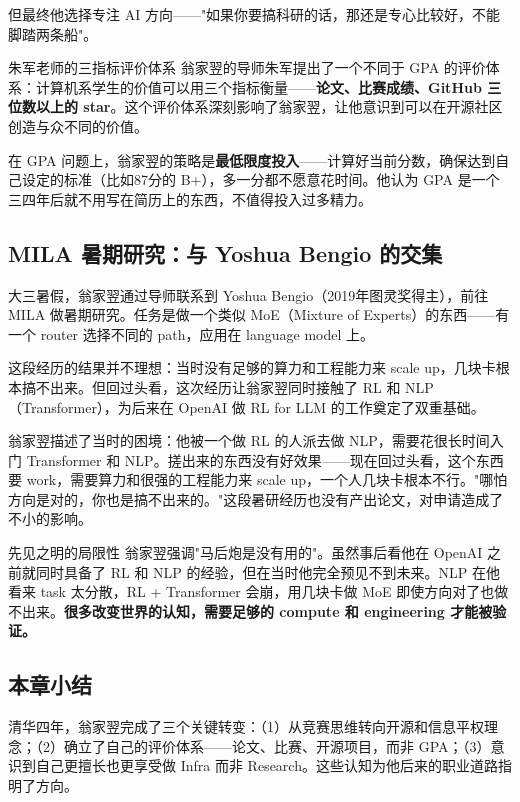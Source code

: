 \documentclass[a4paper]{article}
\begin{document}
但最终他选择专注 AI 方向——"如果你要搞科研的话，那还是专心比较好，不能脚踏两条船"。

\begin{knowledgebox}{朱军老师的三指标评价体系}
翁家翌的导师朱军提出了一个不同于 GPA 的评价体系：计算机系学生的价值可以用三个指标衡量——\textbf{论文、比赛成绩、GitHub 三位数以上的 star}。这个评价体系深刻影响了翁家翌，让他意识到可以在开源社区创造与众不同的价值。
\end{knowledgebox}

在 GPA 问题上，翁家翌的策略是\textbf{最低限度投入}——计算好当前分数，确保达到自己设定的标准（比如87分的 B+），多一分都不愿意花时间。他认为 GPA 是一个三四年后就不用写在简历上的东西，不值得投入过多精力。

\subsection{MILA 暑期研究：与 Yoshua Bengio 的交集}

大三暑假，翁家翌通过导师联系到 Yoshua Bengio（2019年图灵奖得主），前往 MILA 做暑期研究。任务是做一个类似 MoE（Mixture of Experts）的东西——有一个 router 选择不同的 path，应用在 language model 上。

这段经历的结果并不理想：当时没有足够的算力和工程能力来 scale up，几块卡根本搞不出来。但回过头看，这次经历让翁家翌同时接触了 RL 和 NLP（Transformer），为后来在 OpenAI 做 RL for LLM 的工作奠定了双重基础。

翁家翌描述了当时的困境：他被一个做 RL 的人派去做 NLP，需要花很长时间入门 Transformer 和 NLP。搓出来的东西没有好效果——现在回过头看，这个东西要 work，需要算力和很强的工程能力来 scale up，一个人几块卡根本不行。"哪怕方向是对的，你也是搞不出来的。"这段暑研经历也没有产出论文，对申请造成了不小的影响。

\begin{warningbox}{先见之明的局限性}
翁家翌强调"马后炮是没有用的"。虽然事后看他在 OpenAI 之前就同时具备了 RL 和 NLP 的经验，但在当时他完全预见不到未来。NLP 在他看来 task 太分散，RL + Transformer 会崩，用几块卡做 MoE 即使方向对了也做不出来。\textbf{很多改变世界的认知，需要足够的 compute 和 engineering 才能被验证。}
\end{warningbox}

\subsection{本章小结}

清华四年，翁家翌完成了三个关键转变：（1）从竞赛思维转向开源和信息平权理念；（2）确立了自己的评价体系——论文、比赛、开源项目，而非 GPA；（3）意识到自己更擅长也更享受做 Infra 而非 Research。这些认知为他后来的职业道路指明了方向。
\end{document}
